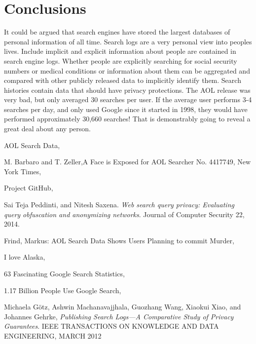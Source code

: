 \documentclass{article}
\begin{document}
\section{Conclusions}
It could be argued that search engines have stored the largest databases of personal information of all time. Search logs are a very personal view into peoples lives. Include implicit and explicit information about people are contained in search engine logs. Whether people are explicitly searching for social security numbers or medical conditions or information about them can be aggregated and compared with other publicly released data to implicitly identify them. Search histories contain data that should have privacy protections. The AOL release was very bad, but only averaged 30 searches per user. If the average user performs 3-4 searches per day, and only used Google since it started in 1998, they would have performed approximately 30,660 searches! That is demonstrably going to reveal a great deal about any person.

\begin{thebibliography}{9}
AOL Search Data,
\\

M. Barbaro and T. Zeller,A Face is Exposed for AOL Searcher No. 4417749, New York Times,
\\

Project GitHub,
\\

Sai Teja Peddinti, and Nitesh Saxena. 
\textit{Web search query privacy: Evaluating query obfuscation and anonymizing networks}. 
Journal of Computer Security 22, 2014.
 
Frind, Markus: AOL Search Data Shows Users Planning to commit Murder,
\\

I love Alaska,
\\

63 Fascinating Google Search Statistics,
\\

1.17 Billion People Use Google Search,
\\

Michaela Götz, Ashwin Machanavajjhala, Guozhang Wang, Xiaokui Xiao, and Johannes Gehrke,
\textit{Publishing Search Logs—A Comparative Study of Privacy Guarantees}.
IEEE TRANSACTIONS ON KNOWLEDGE AND DATA ENGINEERING, MARCH 2012

\end{thebibliography}
\end{document}
